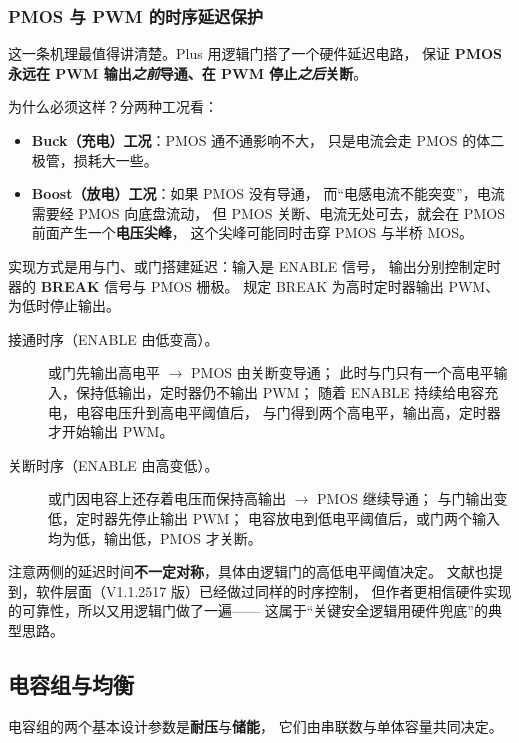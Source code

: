 \documentclass[cn,blue,11pt,device=normal]{elegantnote}
\begin{document}
\subsubsection{PMOS 与 PWM 的时序延迟保护}

这一条机理最值得讲清楚。Plus 用逻辑门搭了一个硬件延迟电路，
保证 \textbf{PMOS 永远在 PWM 输出\emph{之前}导通、在 PWM 停止\emph{之后}关断}。

为什么必须这样？分两种工况看：

\begin{itemize}
  \item \textbf{Buck（充电）工况}：PMOS 通不通影响不大，
  只是电流会走 PMOS 的体二极管，损耗大一些。
  \item \textbf{Boost（放电）工况}：如果 PMOS 没有导通，
  而“电感电流不能突变”，电流需要经 PMOS 向底盘流动，
  但 PMOS 关断、电流无处可去，就会在 PMOS 前面产生一个\textbf{电压尖峰}，
  这个尖峰可能同时击穿 PMOS 与半桥 MOS。
\end{itemize}

实现方式是用与门、或门搭建延迟：输入是 ENABLE 信号，
输出分别控制定时器的 \textbf{BREAK} 信号与 PMOS 栅极。
规定 BREAK 为高时定时器输出 PWM、为低时停止输出。

\begin{description}
  \item[接通时序（ENABLE 由低变高）。]
  或门先输出高电平 $\to$ PMOS 由关断变导通；
  此时与门只有一个高电平输入，保持低输出，定时器仍不输出 PWM；
  随着 ENABLE 持续给电容充电，电容电压升到高电平阈值后，
  与门得到两个高电平，输出高，定时器才开始输出 PWM。
  \item[关断时序（ENABLE 由高变低）。]
  或门因电容上还存着电压而保持高输出 $\to$ PMOS 继续导通；
  与门输出变低，定时器先停止输出 PWM；
  电容放电到低电平阈值后，或门两个输入均为低，输出低，PMOS 才关断。
\end{description}

注意两侧的延迟时间\textbf{不一定对称}，具体由逻辑门的高低电平阈值决定。
文献也提到，软件层面（V1.1.2517 版）已经做过同样的时序控制，
但作者更相信硬件实现的可靠性，所以又用逻辑门做了一遍——
这属于“关键安全逻辑用硬件兜底”的典型思路。

\subsection{电容组与均衡}\label{sec:capbank}

电容组的两个基本设计参数是\textbf{耐压}与\textbf{储能}，
它们由串联数与单体容量共同决定。
\end{document}
